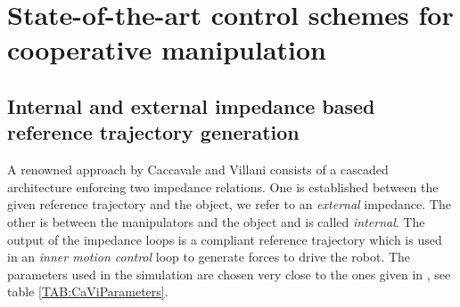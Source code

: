 \documentclass[a4paper,twoside, openright,12pt]{report}
\begin{document}

\section{State-of-the-art control schemes for cooperative manipulation}



%








\subsection{Internal and external impedance based reference trajectory generation}
A renowned approach by Caccavale and Villani \cite{Caccavale_01, Caccavale_08} consists of a cascaded architecture enforcing two impedance relations. One is established between the given reference trajectory and the object, we refer to an \emph{external} impedance. The other is between the manipulators and the object and is called \emph{internal}. The output of the impedance loops is a compliant reference trajectory which is used in an \emph{inner motion control} loop to generate forces to drive the robot. The parameters used in the simulation are chosen very close to the ones given in \cite{Caccavale_08}, see table \ref{TAB:CaViParameters}. 
\end{document}
